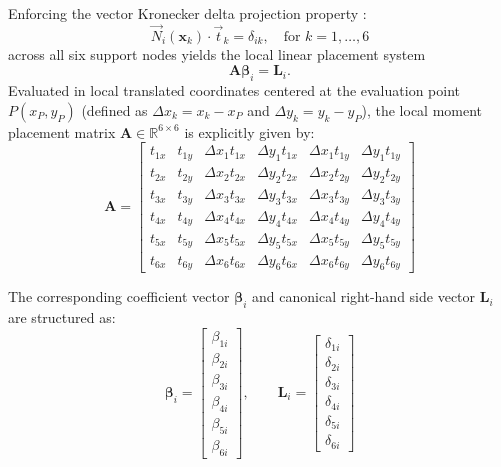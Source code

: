 \documentclass[preprint,12pt]{elsarticle}
\begin{document}
Enforcing the vector Kronecker delta projection property \cite{ortiz2021nodal}:
\begin{equation}
    \vec{N}_i(\mathbf{x}_k) \cdot \vec{t}_k = \delta_{ik}, \quad \text{for } k = 1, \dots, 6
    \label{eq:kronecker_projection_P1}
\end{equation}
across all six support nodes yields the local linear placement system
\begin{equation}
    \mathbf{A} \boldsymbol{\beta}_i = \mathbf{L}_i.
    \label{eq:linear_system_P1}
\end{equation}
Evaluated in local translated coordinates centered at the evaluation point $P(x_P, y_P)$ (defined as $\Delta x_k = x_k - x_P$ and $\Delta y_k = y_k - y_P$), the local moment placement matrix $\mathbf{A} \in \mathbb{R}^{6 \times 6}$ is explicitly given by:
\begin{equation}
    \mathbf{A} = \begin{bmatrix}
        t_{1x} & t_{1y} & \Delta x_1 t_{1x} & \Delta y_1 t_{1x} & \Delta x_1 t_{1y} & \Delta y_1 t_{1y} \\[4pt]
        t_{2x} & t_{2y} & \Delta x_2 t_{2x} & \Delta y_2 t_{2x} & \Delta x_2 t_{2y} & \Delta y_2 t_{2y} \\[4pt]
        t_{3x} & t_{3y} & \Delta x_3 t_{3x} & \Delta y_3 t_{3x} & \Delta x_3 t_{3y} & \Delta y_3 t_{3y} \\[4pt]
        t_{4x} & t_{4y} & \Delta x_4 t_{4x} & \Delta y_4 t_{4x} & \Delta x_4 t_{4y} & \Delta y_4 t_{4y} \\[4pt]
        t_{5x} & t_{5y} & \Delta x_5 t_{5x} & \Delta y_5 t_{5x} & \Delta x_5 t_{5y} & \Delta y_5 t_{5y} \\[4pt]
        t_{6x} & t_{6y} & \Delta x_6 t_{6x} & \Delta y_6 t_{6x} & \Delta x_6 t_{6y} & \Delta y_6 t_{6y}
    \end{bmatrix}
    \label{eq:matrix_A_6x6}
\end{equation}

The corresponding coefficient vector $\boldsymbol{\beta}_i$ and canonical right-hand side vector $\mathbf{L}_i$ are structured as:
\begin{equation}
    \boldsymbol{\beta}_i = \begin{bmatrix} \beta_{1i} \\[2pt] \beta_{2i} \\[2pt] \beta_{3i} \\[2pt] \beta_{4i} \\[2pt] \beta_{5i} \\[2pt] \beta_{6i} \end{bmatrix}, \qquad
    \mathbf{L}_i = \begin{bmatrix} \delta_{1i} \\[2pt] \delta_{2i} \\[2pt] \delta_{3i} \\[2pt] \delta_{4i} \\[2pt] \delta_{5i} \\[2pt] \delta_{6i} \end{bmatrix}
    \label{eq:beta_and_L_vectors_P1}
\end{equation}
\end{document}
